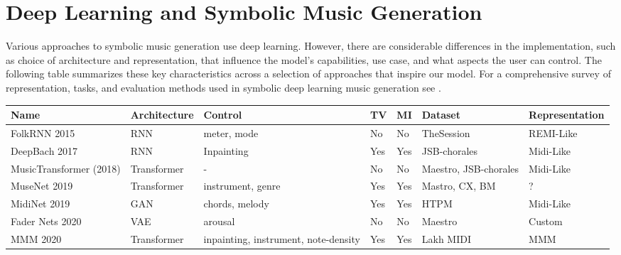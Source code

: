 \section{Deep Learning and Symbolic Music Generation}
Various approaches to symbolic music generation use deep learning. However, there are considerable differences in the implementation, such as choice of architecture and representation, that influence the model's capabilities, use case, and what aspects the user can control. The following table summarizes these key characteristics across a selection of approaches that inspire our model. For a comprehensive survey of representation, tasks, and evaluation methods used in symbolic deep learning music generation see \cite{Ji_Yang_Luo_survey_symbolic_2024}.

\begin{table}[H] \label{bigtable}
    \centering
    \renewcommand{\arraystretch}{1.2} %
    \setlength{\tabcolsep}{3pt} %
    \scriptsize %
    \begin{tabular}{|p{2.5cm}|p{1.8cm}|p{3cm}|p{1cm}|p{1cm}|p{3cm}|p{2.5cm}|}
        \hline
        \textbf{Name} & \textbf{Architecture} & \textbf{Control} & \textbf{TV} & \textbf{MI} & \textbf{Dataset} & \textbf{Representation} \\
        \hline
        FolkRNN 2015 \cite{Sturm_Ben-Tal_2016} & RNN & meter, mode & No & No & TheSession\cite{sessionfolkdata} & REMI-Like\\
        DeepBach 2017 \cite{Hadjeres_Pachet_Nielsen_2017} & RNN & Inpainting & Yes & Yes & JSB-chorales\cite{jsbchorales} & Midi-Like\\ 
        MusicTransformer (2018) \cite{Huang_Vaswani_Uszkoreit_Shazeer_Simon_Hawthorne_Dai_Hoffman_Dinculescu_Eck_2018} & Transformer & - & No & No & Maestro\cite{hawthorne2018maestro},  JSB-chorales\cite{jsbchorales} & Midi-Like\\
        MuseNet 2019 \cite{Christine_2019} & Transformer & instrument, genre & Yes & Yes & Mastro\cite{hawthorne2018maestro}, CX\cite{classicalarchives}, BM\cite{bitmidi} & ?\\
        MidiNet 2019 \cite{midinet} & GAN & chords, melody & Yes & Yes & HTPM\cite{hooktheorypopmidi} & Midi-Like\\
        Fader Nets 2020\cite{Tan_Herremans_2020} & VAE & arousal & No & No & Maestro \cite{hawthorne2018maestro} & Custom \\
        MMM 2020 \cite{Ens_Pasquier_2020_MMM} & Transformer & inpainting, instrument, note-density & Yes & Yes & Lakh MIDI\cite{Raffel_2016} & MMM\\

\end{tabular}
\end{table}
